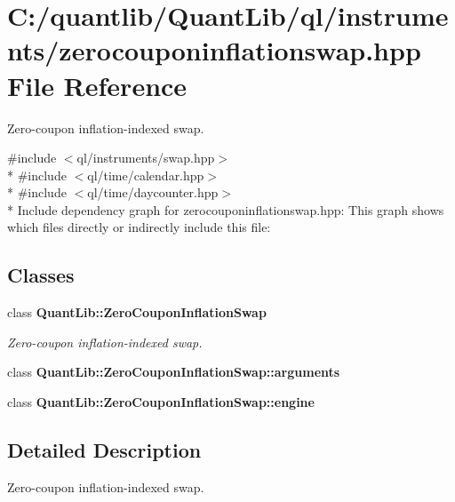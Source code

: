 \section{C\+:/quantlib/\+Quant\+Lib/ql/instruments/zerocouponinflationswap.hpp File Reference}
\label{zerocouponinflationswap_8hpp}


Zero-\/coupon inflation-\/indexed swap.  


{\ttfamily \#include $<$ql/instruments/swap.\+hpp$>$}\\*
{\ttfamily \#include $<$ql/time/calendar.\+hpp$>$}\\*
{\ttfamily \#include $<$ql/time/daycounter.\+hpp$>$}\\*
Include dependency graph for zerocouponinflationswap.\+hpp\+:
This graph shows which files directly or indirectly include this file\+:
\subsection*{Classes}
\begin{DoxyCompactItemize}
\item 
class {\bf Quant\+Lib\+::\+Zero\+Coupon\+Inflation\+Swap}
\begin{DoxyCompactList}\small\item\em Zero-\/coupon inflation-\/indexed swap. \end{DoxyCompactList}\item 
class {\bf Quant\+Lib\+::\+Zero\+Coupon\+Inflation\+Swap\+::arguments}
\item 
class {\bf Quant\+Lib\+::\+Zero\+Coupon\+Inflation\+Swap\+::engine}
\end{DoxyCompactItemize}


\subsection{Detailed Description}
Zero-\/coupon inflation-\/indexed swap. 

